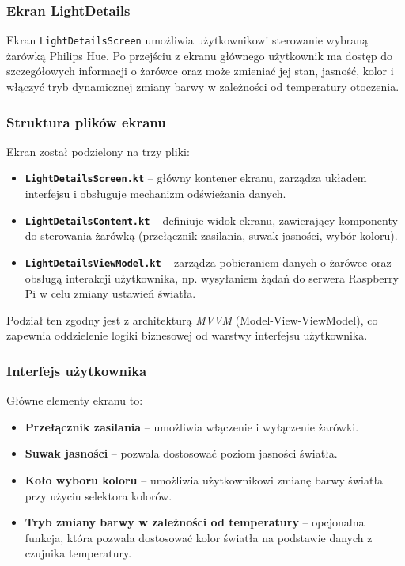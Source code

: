 \documentclass[12pt]{article}
\begin{document}
\subsubsection{Ekran LightDetails}
Ekran \texttt{LightDetailsScreen} umożliwia użytkownikowi sterowanie wybraną żarówką Philips Hue. Po przejściu z ekranu głównego użytkownik ma dostęp do szczegółowych informacji o żarówce oraz
może zmieniać jej stan, jasność, kolor i włączyć tryb dynamicznej zmiany barwy w zależności od temperatury otoczenia.

\subsubsection*{Struktura plików ekranu}
\noindent Ekran został podzielony na trzy pliki:
\begin{itemize}
    \item \textbf{\texttt{LightDetailsScreen.kt}} – główny kontener ekranu, zarządza układem interfejsu i obsługuje mechanizm odświeżania danych.
    \item \textbf{\texttt{LightDetailsContent.kt}} – definiuje widok ekranu, zawierający komponenty do sterowania żarówką (przełącznik zasilania, suwak jasności, wybór koloru).
    \item \textbf{\texttt{LightDetailsViewModel.kt}} – zarządza pobieraniem danych o żarówce oraz obsługą interakcji użytkownika, np. wysyłaniem żądań do serwera Raspberry Pi w celu zmiany ustawień światła.
\end{itemize}

\noindent Podział ten zgodny jest z architekturą \textit{MVVM} (Model-View-ViewModel), co zapewnia oddzielenie logiki biznesowej od warstwy interfejsu użytkownika.

\subsubsection*{Interfejs użytkownika}
\noindent Główne elementy ekranu to:
\begin{itemize}
    \item \textbf{Przełącznik zasilania} – umożliwia włączenie i wyłączenie żarówki.
    \item \textbf{Suwak jasności} – pozwala dostosować poziom jasności światła.
    \item \textbf{Koło wyboru koloru} – umożliwia użytkownikowi zmianę barwy światła przy użyciu selektora kolorów.
    \item \textbf{Tryb zmiany barwy w zależności od temperatury} – opcjonalna funkcja, która pozwala dostosować kolor światła na podstawie danych z czujnika temperatury.
\end{itemize}
\end{document}
